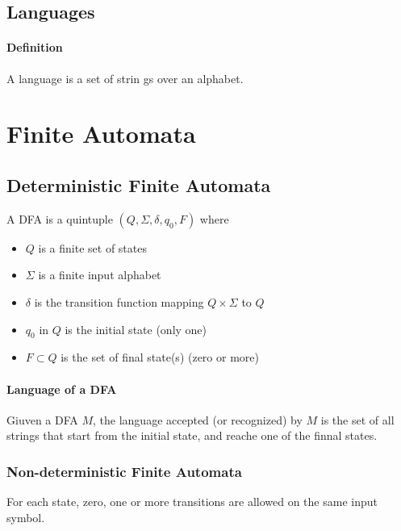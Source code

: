 \documentclass[titlepage]{article}
\begin{document}
        \subsection*{Languages}
            \paragraph{Definition}
            A language is a set of strin gs over an alphabet.
    \section{Finite Automata}
        \subsection*{Deterministic Finite Automata}
            A DFA is a quintuple $(Q,\Sigma,\delta,q_0,F)$ where
            \begin{itemize}
                \item $Q$ is a finite set of states
                \item $\Sigma$ is a finite input alphabet
                \item $\delta$ is the transition function mapping $Q\times \Sigma$ to $Q$
                \item $q_0$ in $Q$ is the initial state (only one)
                \item $F\subset Q$ is the set of final state(s) (zero or more)
            \end{itemize}
            \paragraph{Language of a DFA}
            Giuven a DFA $M$, the language accepted (or recognized) by $M$ is the set of all strings that start from the initial state, and reache one of the finnal states.
        \subsubsection*{Non-deterministic Finite Automata}
            For each state, zero, one or more transitions are allowed on the same input symbol.
\end{document}
